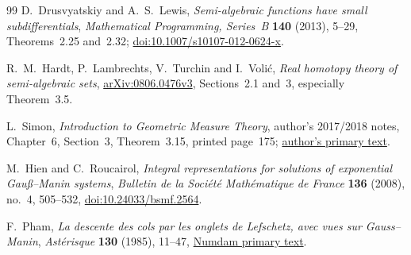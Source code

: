 \documentclass[11pt]{article}
\theoremstyle{definition}\newtheorem{definition}[theorem]{Definition}
\theoremstyle{remark}\newtheorem{remark}[theorem]{Remark}
\begin{document}
\begin{thebibliography}{99}
D.~Drusvyatskiy and A.~S.~Lewis, \emph{Semi-algebraic functions have
small subdifferentials}, \emph{Mathematical Programming, Series~B}
\textbf{140} (2013), 5--29, Theorems~2.25 and~2.32;
\href{https://doi.org/10.1007/s10107-012-0624-x}{doi:10.1007/s10107-012-0624-x}.

R.~M.~Hardt, P.~Lambrechts, V.~Turchin and I.~Voli\'c,
\emph{Real homotopy theory of semi-algebraic sets},
\href{https://arxiv.org/abs/0806.0476v3}{arXiv:0806.0476v3},
Sections~2.1 and~3, especially Theorem~3.5.

L.~Simon, \emph{Introduction to Geometric Measure Theory},
author's 2017/2018 notes, Chapter~6, Section~3, Theorem~3.15,
printed page~175;
\href{https://math.stanford.edu/~lms/ntu-gmt-text.pdf}{author's primary text}.

M.~Hien and C.~Roucairol, \emph{Integral representations for solutions
of exponential Gau\ss--Manin systems},
\emph{Bulletin de la Soci\'et\'e Math\'ematique de France}
\textbf{136} (2008), no.~4, 505--532,
\href{https://doi.org/10.24033/bsmf.2564}{doi:10.24033/bsmf.2564}.

F.~Pham, \emph{La descente des cols par les onglets de Lefschetz,
avec vues sur Gauss--Manin}, \emph{Ast\'erisque} \textbf{130}
(1985), 11--47,
\href{https://numdam.org/item/AST_1985__130__11_0/}{Numdam primary text}.

\end{thebibliography}
\end{document}
